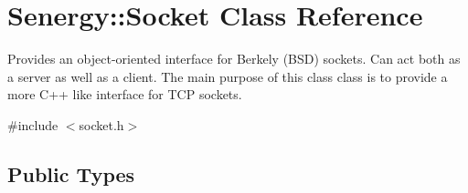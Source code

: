 \hypertarget{class_senergy_1_1_socket}{\section{Senergy\-:\-:Socket Class Reference}
\label{class_senergy_1_1_socket}
}


Provides an object-\/oriented interface for Berkely (B\-S\-D) sockets. Can act both as a server as well as a client. The main purpose of this class class is to provide a more C++ like interface for T\-C\-P sockets.  




{\ttfamily \#include $<$socket.\-h$>$}

\subsection*{Public Types}
